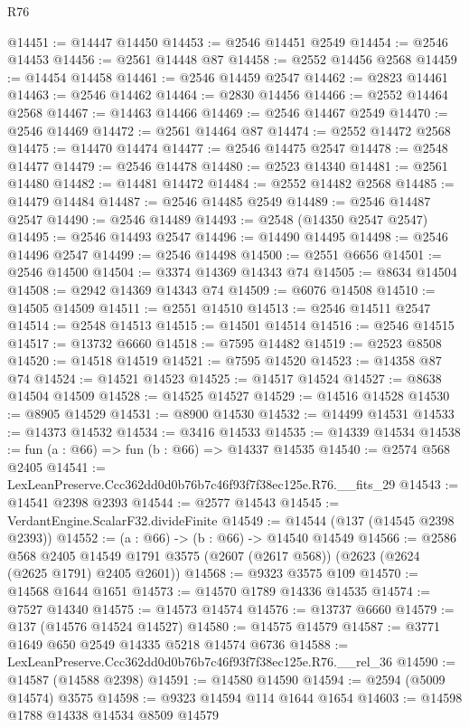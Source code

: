 \begin{lexlean}{R76}
\begin{coremodule}
@14451 := @14447 @14450
@14453 := @2546 @14451 @2549
@14454 := @2546 @14453
@14456 := @2561 @14448 @87
@14458 := @2552 @14456 @2568
@14459 := @14454 @14458
@14461 := @2546 @14459 @2547
@14462 := @2823 @14461
@14463 := @2546 @14462
@14464 := @2830 @14456
@14466 := @2552 @14464 @2568
@14467 := @14463 @14466
@14469 := @2546 @14467 @2549
@14470 := @2546 @14469
@14472 := @2561 @14464 @87
@14474 := @2552 @14472 @2568
@14475 := @14470 @14474
@14477 := @2546 @14475 @2547
@14478 := @2548 @14477
@14479 := @2546 @14478
@14480 := @2523 @14340
@14481 := @2561 @14480
@14482 := @14481 @14472
@14484 := @2552 @14482 @2568
@14485 := @14479 @14484
@14487 := @2546 @14485 @2549
@14489 := @2546 @14487 @2547
@14490 := @2546 @14489
@14493 := @2548 (@14350 @2547 @2547)
@14495 := @2546 @14493 @2547
@14496 := @14490 @14495
@14498 := @2546 @14496 @2547
@14499 := @2546 @14498
@14500 := @2551 @6656
@14501 := @2546 @14500
@14504 := @3374 @14369 @14343 @74
@14505 := @8634 @14504
@14508 := @2942 @14369 @14343 @74
@14509 := @6076 @14508
@14510 := @14505 @14509
@14511 := @2551 @14510
@14513 := @2546 @14511 @2547
@14514 := @2548 @14513
@14515 := @14501 @14514
@14516 := @2546 @14515
@14517 := @13732 @6660
@14518 := @7595 @14482
@14519 := @2523 @8508
@14520 := @14518 @14519
@14521 := @7595 @14520
@14523 := @14358 @87 @74
@14524 := @14521 @14523
@14525 := @14517 @14524
@14527 := @8638 @14504 @14509
@14528 := @14525 @14527
@14529 := @14516 @14528
@14530 := @8905 @14529
@14531 := @8900 @14530
@14532 := @14499 @14531
@14533 := @14373 @14532
@14534 := @3416 @14533
@14535 := @14339 @14534
@14538 := fun (a : @66) => fun (b : @66) => @14337 @14535
@14540 := @2574 @568 @2405
@14541 := LexLeanPreserve.Ccc362dd0d0b76b7c46f93f7f38ec125e.R76.__fits_29
@14543 := @14541 @2398 @2393
@14544 := @2577 @14543
@14545 := VerdantEngine.ScalarF32.divideFinite
@14549 := @14544 (@137 (@14545 @2398 @2393))
@14552 := (a : @66) -> (b : @66) -> @14540 @14549
@14566 := @2586
    @568
    @2405
    @14549
    @1791
    @3575
    (@2607 (@2617 @568))
    (@2623 (@2624 (@2625 @1791) @2405 @2601))
@14568 := @9323 @3575 @109
@14570 := @14568 @1644 @1651
@14573 := @14570 @1789 @14336 @14535
@14574 := @7527 @14340
@14575 := @14573 @14574
@14576 := @13737 @6660
@14579 := @137 (@14576 @14524 @14527)
@14580 := @14575 @14579
@14587 := @3771 @1649 @650 @2549 @14335 @5218 @14574 @6736
@14588 := LexLeanPreserve.Ccc362dd0d0b76b7c46f93f7f38ec125e.R76.__rel_36
@14590 := @14587 (@14588 @2398)
@14591 := @14580 @14590
@14594 := @2594 (@5009 @14574) @3575
@14598 := @9323 @14594 @114 @1644 @1654
@14603 := @14598 @1788 @14338 @14534 @8509 @14579

\end{coremodule}
\end{lexlean}
